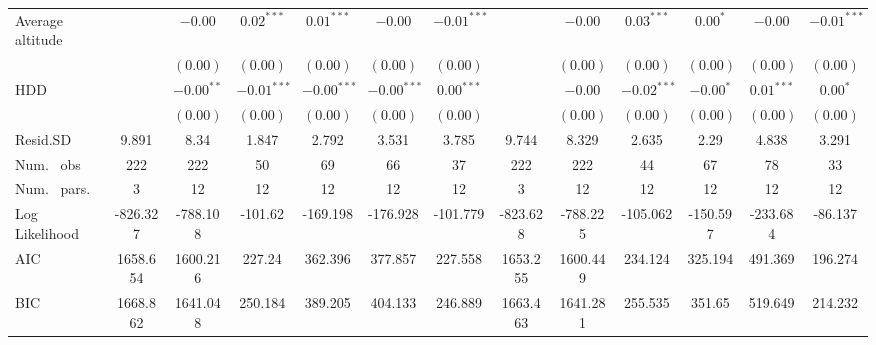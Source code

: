 \begin{table}
\begin{center}
\begin{tabular}{l c c c c c c c c c c c c}
Average altitude                  &               & $-0.00$       & $0.02^{***}$  & $0.01^{***}$   & $-0.00$       & $-0.01^{***}$ &               & $-0.00$       & $0.03^{***}$  & $0.00^{*}$    & $-0.00$       & $-0.01^{***}$  \\
                                  &               & $(0.00)$      & $(0.00)$      & $(0.00)$       & $(0.00)$      & $(0.00)$      &               & $(0.00)$      & $(0.00)$      & $(0.00)$      & $(0.00)$      & $(0.00)$       \\
HDD                               &               & $-0.00^{**}$  & $-0.01^{***}$ & $-0.00^{***}$  & $-0.00^{***}$ & $0.00^{***}$  &               & $-0.00$       & $-0.02^{***}$ & $-0.00^{*}$   & $0.01^{***}$  & $0.00^{*}$     \\
                                  &               & $(0.00)$      & $(0.00)$      & $(0.00)$       & $(0.00)$      & $(0.00)$      &               & $(0.00)$      & $(0.00)$      & $(0.00)$      & $(0.00)$      & $(0.00)$       \\
\hline
Resid.SD                          & 9.891         & 8.34          & 1.847         & 2.792          & 3.531         & 3.785         & 9.744         & 8.329         & 2.635         & 2.29          & 4.838         & 3.291          \\
Num. \ obs                        & 222           & 222           & 50            & 69             & 66            & 37            & 222           & 222           & 44            & 67            & 78            & 33             \\
Num. \ pars.                      & 3             & 12            & 12            & 12             & 12            & 12            & 3             & 12            & 12            & 12            & 12            & 12             \\
Log Likelihood                    & -826.327      & -788.108      & -101.62       & -169.198       & -176.928      & -101.779      & -823.628      & -788.225      & -105.062      & -150.597      & -233.684      & -86.137        \\
AIC                               & 1658.654      & 1600.216      & 227.24        & 362.396        & 377.857       & 227.558       & 1653.255      & 1600.449      & 234.124       & 325.194       & 491.369       & 196.274        \\
BIC                               & 1668.862      & 1641.048      & 250.184       & 389.205        & 404.133       & 246.889       & 1663.463      & 1641.281      & 255.535       & 351.65        & 519.649       & 214.232        \\

\end{tabular}
\end{center}
\end{table}
